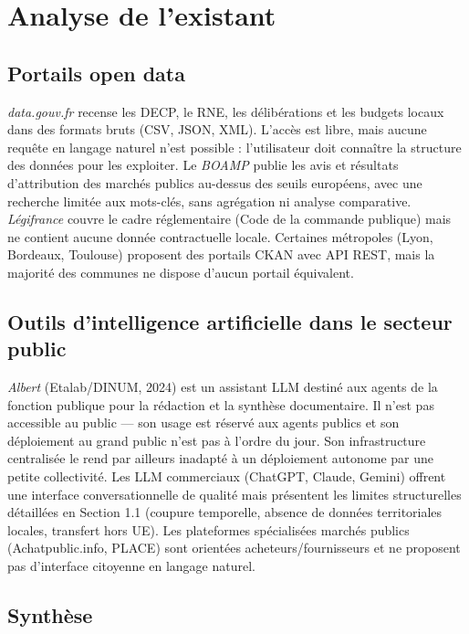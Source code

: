 \section{Analyse de l'existant}

\subsection{Portails open data}

\textit{data.gouv.fr} recense les DECP, le RNE, les délibérations et les budgets locaux dans des formats bruts (CSV, JSON, XML). L'accès est libre, mais aucune requête en langage naturel n'est possible : l'utilisateur doit connaître la structure des données pour les exploiter. Le \textit{BOAMP} publie les avis et résultats d'attribution des marchés publics au-dessus des seuils européens, avec une recherche limitée aux mots-clés, sans agrégation ni analyse comparative. \textit{Légifrance} couvre le cadre réglementaire (Code de la commande publique) mais ne contient aucune donnée contractuelle locale. Certaines métropoles (Lyon, Bordeaux, Toulouse) proposent des portails CKAN avec API REST, mais la majorité des communes ne dispose d'aucun portail équivalent.

\subsection{Outils d'intelligence artificielle dans le secteur public}

\textit{Albert} (Etalab/DINUM, 2024) est un assistant LLM destiné aux agents de la fonction publique pour la rédaction et la synthèse documentaire. Il n'est pas accessible au public --- son usage est réservé aux agents publics et son déploiement au grand public n'est pas à l'ordre du jour. Son infrastructure centralisée le rend par ailleurs inadapté à un déploiement autonome par une petite collectivité. Les LLM commerciaux (ChatGPT, Claude, Gemini) offrent une interface conversationnelle de qualité mais présentent les limites structurelles détaillées en Section 1.1 (coupure temporelle, absence de données territoriales locales, transfert hors UE). Les plateformes spécialisées marchés publics (Achatpublic.info, PLACE) sont orientées acheteurs/fournisseurs et ne proposent pas d'interface citoyenne en langage naturel.

\subsection{Synthèse}

